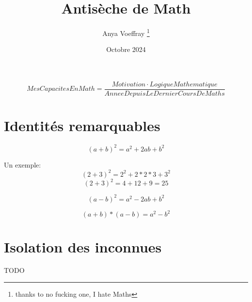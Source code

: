 \documentclass{article}
\title{Antisèche de Math}
\author{Anya Voeffray \thanks{thanks to no fucking one, I hate Maths}}
\date{Octobre 2024}
\begin{document}
	
	
\begin{titlepage}
	
	\maketitle
	
	\begin{equation}
		Mes Capacites En Math =  \frac{Motivation \cdot LogiqueMathematique}{Annee Depuis Le Dernier Cours De Maths}
	\end{equation}
	
\end{titlepage}

\section{Identités remarquables}

\begin{equation}
	(a+b)^2 = a^2 + 2ab + b^2
\end{equation}

Un exemple:
\begin{equation}
	(2 + 3)^2 = 2^2 + 2\ast2\ast3 + 3^2
\end{equation}
\begin{equation}
	(2 + 3)^2 = 4 + 12 + 9 = 25
\end{equation}

\begin{equation}
	(a−b)^2 = a^2 − 2ab + b^2
\end{equation}

\begin{equation}
	(a+b)\ast(a−b) = a^2 − b^2
\end{equation}

\section{Isolation des inconnues}

TODO
	
\end{document}
